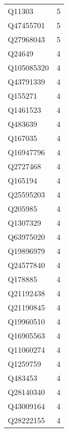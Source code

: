 \begin{tabular}{lr}
      Q11303 &                             5 \\
   Q47455701 &                             5 \\
   Q27968043 &                             5 \\
      Q24649 &                             4 \\
  Q105085320 &                             4 \\
   Q43791339 &                             4 \\
     Q155271 &                             4 \\
    Q1461523 &                             4 \\
     Q483639 &                             4 \\
     Q167035 &                             4 \\
   Q16947796 &                             4 \\
    Q2727468 &                             4 \\
     Q165194 &                             4 \\
   Q25595203 &                             4 \\
     Q205985 &                             4 \\
    Q1307329 &                             4 \\
   Q63975020 &                             4 \\
   Q19896979 &                             4 \\
   Q24577840 &                             4 \\
     Q178885 &                             4 \\
   Q21192438 &                             4 \\
   Q21190845 &                             4 \\
   Q19960510 &                             4 \\
   Q16905563 &                             4 \\
   Q11060274 &                             4 \\
    Q1259759 &                             4 \\
     Q483453 &                             4 \\
   Q28140340 &                             4 \\
   Q43009164 &                             4 \\
   Q28222155 &                             4 \\

\end{tabular}
